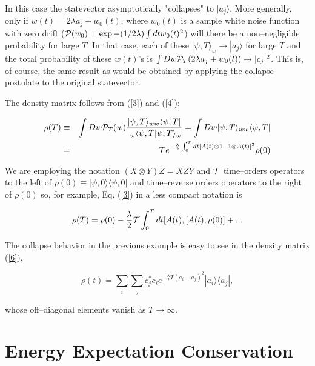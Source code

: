 \documentclass{article}
\begin{document}
\noindent In this case the statevector asymptotically 
"collapses" to $|a_{j}\rangle$. More generally, only if 
$w(t)=2\lambda a_{j}+w_{0}(t)$, where $w_{0}(t)$ is a sample white noise function with 
zero drift (${\cal P}(w_{0})=\exp -(1/2\lambda)\int dtw_{0}(t)^{2}$) will there be a  
non--negligible probability for large $T$.  In that case, 
each of these $|\psi,T\rangle_{w}\rightarrow |a_{j}\rangle$ for large $T$ and the 
total probability of these $w(t)$'s is 
$\int Dw{\cal P}_{T}(2\lambda a_{j}+w_{0}(t))\rightarrow |c_{j}|^{2}$. 
This is, of course, the same result as would be obtained by applying 
the collapse postulate to the original statevector. 

	The density matrix follows from (\ref{3}) and (\ref{4}):  
	
\begin{eqnarray}\label{6}
	\rho (T)&\equiv&\int Dw{\cal P}_{T}(w)\frac{|\psi,T\rangle_{ww}
	\langle\psi,T|}{\ _{w}\langle\psi,T|\psi,T\rangle_{w}}
	=\int Dw|\psi,T\rangle_{ww}\langle\psi,T|\nonumber\\
	&=&{\cal T}e^
	{-\frac{\lambda}{2}\int_{0}^{T} dt[A(t)\otimes 1-1\otimes A(t)]^{2}}\rho (0)
\end{eqnarray} 

\noindent We are employing the notation $(X\otimes Y)Z=XZY$ 
and ${\cal T}$ time--orders operators to the left of $\rho (0)\equiv |\psi,0\rangle 
	\langle\psi,0|$ and 
time--reverse orders operators to the right of $\rho (0)$ so, for example,  Eq. (\ref{3}) in 
a less compact notation is 

\begin{eqnarray*}
	\rho (T) = \rho (0)-\frac{\lambda}{2}{\cal T}\int_{0}^{T} dt[A(t),[A(t), \rho (0)] + ...
\end{eqnarray*}

\noindent The collapse 
behavior in the previous example is easy to see in the 
density matrix (\ref{6}), 

\begin{displaymath}
\rho (t)=\sum_{i}\sum_{j}c_{j}^{*}c_{i}e^{-\frac{\lambda}{2} T(a_{i}-a_{j})^{2}}
|a_{i}\rangle\langle a_{j}|,
\end{displaymath}

\noindent whose off--diagonal elements vanish as $T\rightarrow\infty$. 

 \section{Energy Expectation Conservation}\label{Energy Conservation}
 
\end{document}
